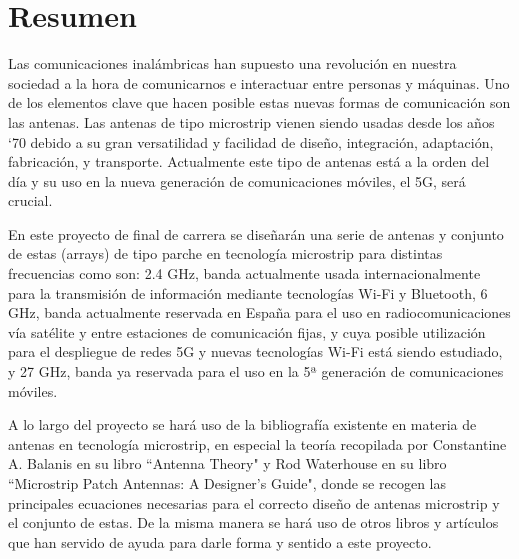 \thispagestyle{empty}
\vspace*{-20cm}
\chapter*{Resumen}

\par Las comunicaciones inalámbricas han supuesto una revolución en nuestra sociedad a la hora de comunicarnos e interactuar entre personas y máquinas. Uno de los elementos clave que hacen posible estas nuevas formas de comunicación son las antenas. Las antenas de tipo microstrip vienen siendo usadas desde los años ‘70 debido a su gran versatilidad y facilidad de diseño, integración, adaptación, fabricación, y transporte. Actualmente este tipo de antenas está a la orden del día y su uso en la nueva generación de comunicaciones móviles, el 5G, será crucial.
\\
\par En este proyecto de final de carrera se diseñarán una serie de antenas y conjunto de estas (arrays) de tipo parche en tecnología microstrip para distintas frecuencias como son: 2.4 GHz, banda actualmente usada internacionalmente para la transmisión de información mediante tecnologías Wi-Fi y Bluetooth, 6 GHz, banda actualmente reservada en España para el uso en radiocomunicaciones vía satélite y entre estaciones de comunicación fijas, y cuya posible utilización para el despliegue de redes 5G y nuevas tecnologías Wi-Fi está siendo estudiado, y 27 GHz, banda ya reservada para el uso en la 5ª generación de comunicaciones móviles.
\\
\par A lo largo del proyecto se hará uso de la bibliografía existente en materia de antenas en tecnología microstrip, en especial la teoría recopilada por Constantine A. Balanis en su libro ``Antenna Theory" y Rod Waterhouse en su libro ``Microstrip Patch Antennas: A Designer's Guide", donde se recogen las principales ecuaciones necesarias para el correcto diseño de antenas microstrip y el conjunto de estas. De la misma manera se hará uso de otros libros y artículos que han servido de ayuda para darle forma y sentido a este proyecto.
\\
